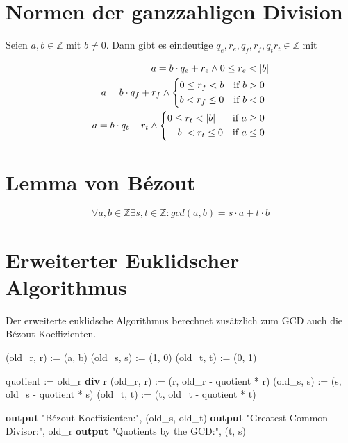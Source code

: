 \documentclass[a4paper, ngerman, landscape, fleqn]{article}
\begin{document}
\begin{multicols*}{3}
\section*{Normen der ganzzahligen Division}
Seien $a, b \in \mathbb{Z}$ mit $b \neq 0$. Dann gibt es eindeutige $q_e, r_e, q_f, r_f, q_t r_t \in \mathbb{Z}$ mit

\begin{align*}
    a = b \cdot q_e + r_e \wedge 0 \leq r_e < | b | \\
    a = b \cdot q_f + r_f \wedge 
    \begin{cases*}
        0 \leq r_f < b & if $b > 0$ \\
        b < r_f \leq 0 & if $b < 0$
    \end{cases*} \\
    a = b \cdot q_t + r_t \wedge 
    \begin{cases*}
        0 \leq r_t < |b| & if $a \geq 0$ \\
        -|b| < r_t \leq 0 & if $a \leq 0$
    \end{cases*}
\end{align*}


\section*{Lemma von Bézout}
\begin{equation*}
    \forall a, b \in \mathbb{Z} \exists s, t \in \mathbb{Z} : gcd(a, b) = s \cdot a + t \cdot b
\end{equation*}

\section*{Erweiterter Euklidscher Algorithmus}

Der erweiterte euklidsche Algorithmus berechnet zusätzlich zum GCD auch die Bézout-Koeffizienten.

\begin{algorithmic}
        \State (old\_r, r) := (a, b)
        \State (old\_s, s) := (1, 0)
        \State (old\_t, t) := (0, 1)

            \State quotient := old\_r \textbf{div} r
            \State (old\_r, r) := (r, old\_r - quotient * r)
            \State (old\_s, s) := (s, old\_s - quotient * s)
            \State (old\_t, t) := (t, old\_t - quotient * t)
        \EndWhile

        \State \textbf{output} "Bézout-Koeffizienten:", (old\_s, old\_t)
        \State \textbf{output} "Greatest Common Divisor:", old\_r
        \State \textbf{output} "Quotients by the GCD:", (t, s)

    \EndFunction
\end{algorithmic}


\end{multicols*}
\end{document}
